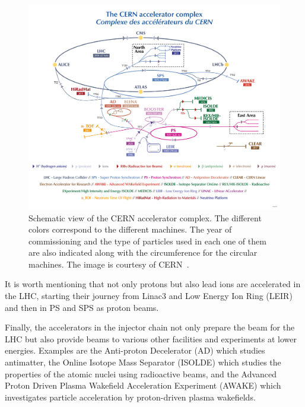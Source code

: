 \begin{figure}[!h] %
    \centering         
    \includegraphics[width=1\textwidth]{images/introduction/cern_accelerator_complex.png}
        \caption{Schematic view of the CERN accelerator complex. The different colors correspond to the different machines. The year of commissioning and the type of particles used in each one of them are also indicated along with the circumference for the circular machines. The image is courtesy of CERN~\cite{Lopienska:2800984}.}
        \label{fig:cern_accelerator_complex}
 \end{figure}

 It is worth mentioning that not only protons but also lead ions are accelerated in the LHC, starting their journey from Linac3 and Low Energy Ion Ring (LEIR) and then in PS and SPS as proton beams.

 Finally, the accelerators in the injector chain not only prepare the beam for the LHC but also provide beams to various other facilities and experiments at lower energies. Examples are the Anti-proton Decelerator (AD) which studies antimatter, the Online Isotope Mass Separator (ISOLDE) which studies the properties of the atomic nuclei using radioactive beams, and the Advanced Proton Driven Plasma Wakefield Acceleration Experiment (AWAKE) which investigates particle acceleration by proton-driven plasma wakefields.

